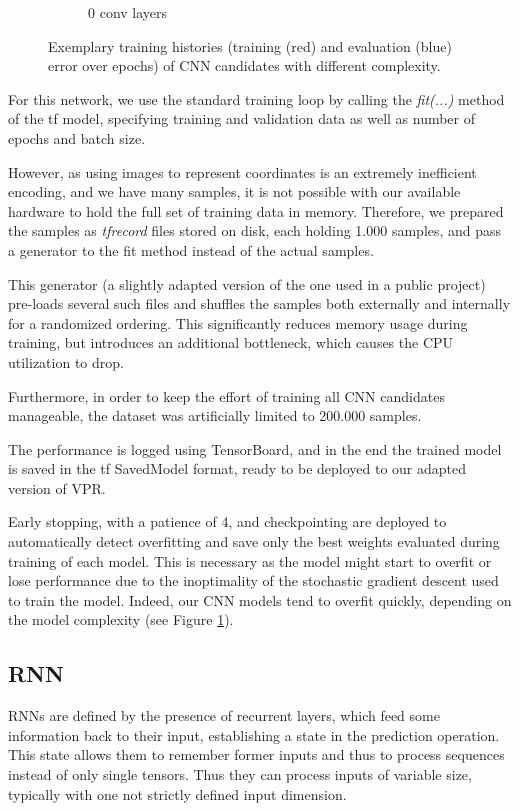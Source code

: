 \begin{figure}
\begin{subfigure}[b]{0.3\linewidth}
		\caption{0 conv layers}
	\end{subfigure}
	\caption{Exemplary training histories (training (red) and evaluation (blue) error over epochs) of \gls{CNN} candidates with different complexity.}
	\label{fig:cnn-train}
\end{figure}

For this network, we use the standard training loop by calling the \textit{fit(...)} method of the \gls{tf} model, specifying training and validation data as well as number of epochs and batch size.

However, as using images to represent coordinates is an extremely inefficient encoding, and we have many samples, it is not possible with our available hardware to hold the full set of training data in memory. Therefore, we prepared the samples as \textit{tfrecord} files stored on disk, each holding 1.000 samples, and pass a generator to the fit method instead of the actual samples.

This generator (a slightly adapted version of the one used in a public project\cite{tfrecord-project-web}) pre-loads several such files and shuffles the samples both externally and internally for a randomized ordering. This significantly reduces memory usage during training, but introduces an additional bottleneck, which causes the CPU utilization to drop.

Furthermore, in order to keep the effort of training all \gls{CNN} candidates manageable, the dataset was artificially limited to 200.000 samples.

The performance is logged using TensorBoard\cite{tensorboard-web}, and in the end the trained model is saved in the \gls{tf} SavedModel format\cite{savedmodel-web}, ready to be deployed to our adapted version of \gls{VPR}.

Early stopping, with a patience of 4, and checkpointing are deployed to automatically detect overfitting and save only the best weights evaluated during training of each model. This is necessary as the model might start to overfit or lose performance due to the inoptimality of the stochastic gradient descent used to train the model. Indeed, our \gls{CNN} models tend to overfit quickly, depending on the model complexity (see Figure \ref{fig:cnn-train}). 

\subsection{\gls{RNN}}

\glspl{RNN} are defined by the presence of recurrent layers, which feed some information back to their input, establishing a state in the prediction operation. This state allows them to remember former inputs and thus to process sequences instead of only single tensors. Thus they can process inputs of variable size, typically with one not strictly defined input dimension.

